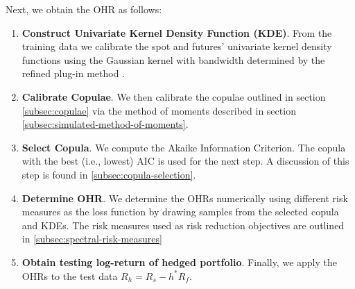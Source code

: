 Next, we obtain the OHR as follows:

\begin{enumerate}
\item \textbf{Construct Univariate Kernel Density Function (KDE)}.
  From the training data we calibrate the spot and futures'
  univariate kernel density functions using the Gaussian kernel with
  bandwidth determined by the refined plug-in method \citep[section
  3.3.3]{hardle2004nonparametric}.
\item \textbf{Calibrate Copulae}.
  We then calibrate the copulae outlined in section \ref{subsec:copulae} via the
  method of moments described in section \ref{subsec:simulated-method-of-moments}.
\item \textbf{Select Copula}.
  We compute the Akaike Information Criterion. The copula with the
  best (i.e., lowest) AIC is used for the next step. 
  A discussion of this step is found in \ref{subsec:copula-selection}.
\item \textbf{Determine OHR}.
  We determine the OHRs numerically using different risk measures as
  the loss function by drawing samples from the selected copula and
  KDEs. The risk measures used as risk reduction objectives are
  outlined in \ref{subsec:spectral-risk-measures} 
  \item \textbf{Obtain testing log-return of hedged portfolio}.
  Finally, we apply the OHRs to the test data $R_h = R_s - h^* R_f$.
  \end{enumerate}












%

